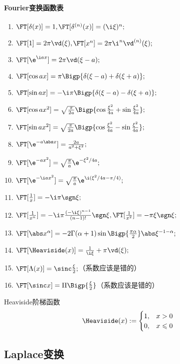 \paragraph{Fourier变换函数表}
\begin{enumerate}
	\item $\FT[\delta(x)]=1,$\qquad$\FT[\delta^{(n)}(x)]=(\i\xi)^n;$
	\item $\FT[1]=2\pi\vd(\xi),$\qquad$\FT[x^n]=2\pi\i^n\vd^{(n)}(\xi);$
	\item $\FT[\e^{\i ax}]=2\pi\vd(\xi-a);$
	\item $\FT[\cos ax]=\pi\Bigp{\delta(\xi-a)+\delta(\xi+a)};$
	\item $\FT[\sin ax]=-\i\pi\Bigp{\delta(\xi-a)-\delta(\xi+a)};$
	\item $\FT[\cos ax^2]=\sqrt{\frac\pi{2a}}\Bigp{\cos\frac{\xi^2}{4a}+\sin\frac{\xi^2}{4a}};$
	\item $\FT[\sin ax^2]=\sqrt{\frac\pi{2a}}\Bigp{\cos\frac{\xi^2}{4a}-\sin\frac{\xi^2}{4a}};$
	\item $\FT[\e^{-a\abs x}]=\frac{2a}{a^2+\xi^2};$
	\item $\FT[\e^{-ax^2}]=\sqrt{\frac\pi{a}}\e^{-\xi^2/4a};$
	\item $\FT[\e^{-\i ax^2}]=\sqrt{\frac\pi{a}}\e^{\i(\xi^2/4a-\pi/4)};$
	\item $\FT[\frac1x]=-\i\pi\sgn\xi;$
	\item $\FT[\frac1{x^n}]=-\i\pi\frac{(-\i\xi)^{n-1}}{(n-1)!}\sgn\xi,$\qquad$\FT[\frac1{x^2}]=-\pi\xi\sgn\xi;$
	\item $\FT[\abs x^\alpha]=-2\Gamma(\alpha+1)\sin\Bigp{\frac{\pi\alpha}2}\abs\xi^{-1-\alpha};$
	\item $\FT[\Heaviside(x)]=\frac1{\i\xi}+\pi\vd(\xi);$
	\item $\FT[\Lambda(x)]=\sinc\frac\xi{2};$（系数应该是错的）
	\item $\FT[\sinc x]=\Pi\Bigp{\frac\xi{2}}$（系数应该是错的）
\end{enumerate}
Heaviside阶梯函数
\[
	\Heaviside(x):=\begin{cases}
	1,&x>0\\
	0,&x\leqslant 0
	\end{cases}
\]
\subsection{Laplace变换}
